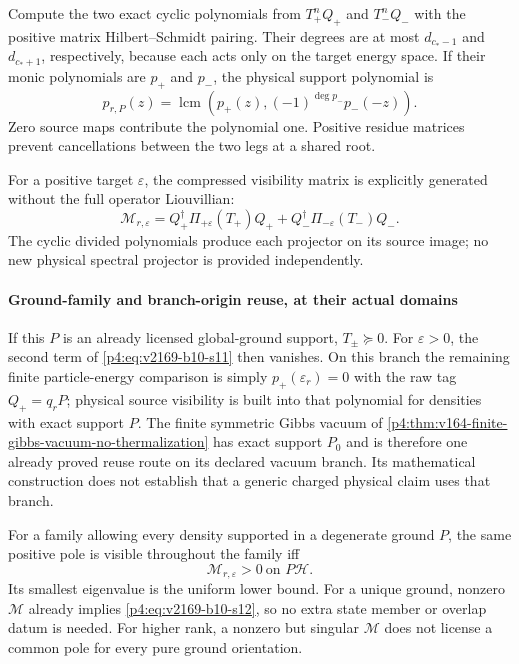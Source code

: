 \documentclass[12pt,a4paper]{article}
\begin{document}
Compute the two exact cyclic polynomials from
$T_+^nQ_+$ and $T_-^nQ_-$ with the positive matrix Hilbert--Schmidt pairing.
Their degrees are at most $d_{c_*-1}$ and $d_{c_*+1}$, respectively, because
each acts only on the target energy space. If their monic polynomials are
$p_+$ and $p_-$, the physical support polynomial is
\begin{equation}
 \boxed{p_{r,P}(z)=\operatorname{lcm}
       \left(p_+(z),(-1)^{\deg p_-}p_-(-z)\right).}
 \label{p4:eq:v2169-b10-s10}
\end{equation}
Zero source maps contribute the polynomial one. Positive residue matrices
prevent cancellations between the two legs at a shared root.

For a positive target $\varepsilon$, the compressed visibility matrix is
explicitly generated without the full operator Liouvillian:
\begin{equation}
 \boxed{\mathcal M_{r,\varepsilon}
   =Q_+^\dagger\Pi_{+\varepsilon}(T_+)Q_+
          +Q_-^\dagger\Pi_{-\varepsilon}(T_-)Q_-.}
 \label{p4:eq:v2169-b10-s11}
\end{equation}
The cyclic divided polynomials produce each projector on its source image;
no new physical spectral projector is provided independently.



\paragraph{Ground-family and branch-origin reuse, at their actual domains}
If this $P$ is an already licensed global-ground support, $T_\pm\succeq0$.
For $\varepsilon>0$, the second term of \eqref{p4:eq:v2169-b10-s11} then vanishes.
On this branch the remaining finite particle-energy comparison is simply
$p_+(\varepsilon_r)=0$ with the raw tag $Q_+=q_rP$; physical source visibility
is built into that polynomial for densities with exact support $P$.
The finite symmetric Gibbs vacuum of
\ref{p4:thm:v164-finite-gibbs-vacuum-no-thermalization} has exact support
$P_0$ and is therefore one already proved reuse route on its declared vacuum
branch. Its mathematical construction does not establish that a generic
charged physical claim uses that branch.

For a family allowing every density supported in a degenerate ground $P$,
the same positive pole is visible throughout the family iff
\begin{equation}
 \boxed{\mathcal M_{r,\varepsilon}>0\ \text{on }P\mathcal H.}
 \label{p4:eq:v2169-b10-s12}
\end{equation}
Its smallest eigenvalue is the uniform lower bound. For a unique ground,
nonzero $\mathcal M$ already implies \eqref{p4:eq:v2169-b10-s12}, so no extra state member or
overlap datum is needed. For higher rank, a nonzero but singular $\mathcal M$
does not license a common pole for every pure ground orientation.
\end{document}
